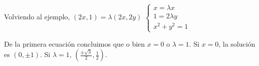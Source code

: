 \documentclass[10pt,a4paper,openright]{book}
\theoremstyle{break}
\begin{document}
Volviendo al ejemplo, $(2x,1) = \lambda (2x, 2y)$
$\begin{cases} x = \lambda x \\ 1 = 2\lambda y \\ x^2 + y^2 = 1\end{cases}$

De la primera ecuación concluimos que o bien $x = 0$ o $\lambda = 1$. Si $x = 0$, la solución es $(0, \pm 1)$. Si $\lambda = 1$, $(\frac{\pm \sqrt{3}}{2}, \frac{1}{2})$. 
\end{document}
